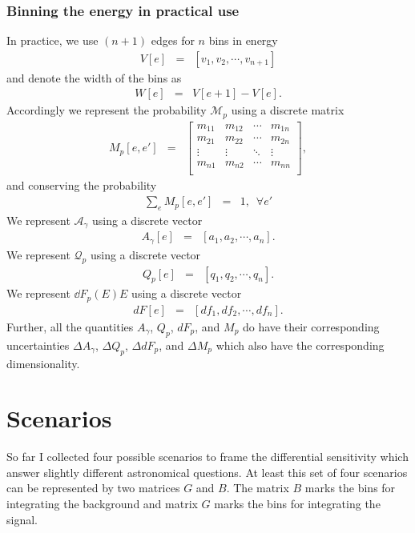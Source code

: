 \documentclass{article}%
\begin{document}
\subsubsection*{Binning the energy in practical use}
%
In practice, we use $(n+1)$ edges for $n$ bins in energy
%
\begin{eqnarray*}
V[e] &=& [v_1, v_2, \cdots, v_{n+1}]
\end{eqnarray*}
%
and denote the width of the bins as
%
\begin{eqnarray*}
W[e] &=& V[e+1] - V[e].
\end{eqnarray*}
%
Accordingly we represent the probability $\mathcal{M}_p$ using a discrete matrix
%
\begin{eqnarray*}
M_p[e, e'] &=&
  \left[ {\begin{array}{cccc}
    m_{11} & m_{12} & \cdots & m_{1n}\\
    m_{21} & m_{22} & \cdots & m_{2n}\\
    \vdots & \vdots & \ddots & \vdots\\
    m_{n1} & m_{n2} & \cdots & m_{nn}\\
  \end{array} } \right],
\end{eqnarray*}
%
and conserving the probability
%
\begin{eqnarray*}
\sum_{e} M_p[e, e'] &=& 1, \, \, \, \forall e'
\end{eqnarray*}
%
We represent $\mathcal{A}_\gamma$ using a discrete vector
%
\begin{eqnarray*}
A_\gamma[e] &=& [a_1, a_2, \cdots, a_n].
\end{eqnarray*}
%
We represent $\mathcal{Q}_p$ using a discrete vector
%
\begin{eqnarray*}
Q_p[e] &=& [q_1, q_2, \cdots, q_n].
\end{eqnarray*}
%
We represent $\dd{F_p(E)}{E}$ using a discrete vector
%
\begin{eqnarray*}
dF[e] &=& [df_1, df_2, \cdots, df_n].
\end{eqnarray*}
%
Further, all the quantities $A_\gamma$, $Q_p$, $dF_p$, and $M_p$ do have their corresponding uncertainties $\Delta A_\gamma$, $\Delta Q_p$, $\Delta dF_p$, and $\Delta M_p$ which also have the corresponding dimensionality.
%
\section{Scenarios}
%
So far I collected four possible scenarios to frame the differential sensitivity which answer slightly different astronomical questions.
%
At least this set of four scenarios can be represented by two matrices $G$ and $B$.
%
The matrix $B$ marks the bins for integrating the background and matrix $G$ marks the bins for integrating the signal.
%
\end{document}
